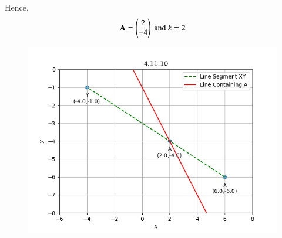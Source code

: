 \documentclass[journal]{IEEEtran}
\numberwithin{equation}{enumi}
\numberwithin{figure}{enumi}
\begin{document}
Hence, 
\begin{align}
    \mathbf{A} = \begin{pmatrix}2 \\ -4 \end{pmatrix} \text{ and } k = 2
\end{align}


\begin{figure}[H]
    \centering
    \includegraphics[width=1.0\columnwidth]{figs/section1.png}
    \caption*{}
    \label{fig:}
\end{figure}
\end{document}

